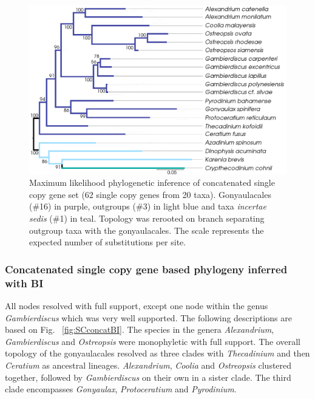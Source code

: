 \documentclass[12pt]{article}
\begin{document}
\begin{figure} 
\includegraphics[scale=.45]{figures/SC-concat-ML_WAG.png} 
\caption{Maximum likelihood phylogenetic inference of concatenated single copy gene set (62 single copy genes from 20 taxa). Gonyaulacales (\#16) in purple, outgroups (\#3) in light blue and taxa \textit{incertae sedis} (\#1) in teal. Topology was rerooted on branch separating outgroup taxa with the gonyaulacales. The scale represents the expected number of substitutions per site.} 
\label{fig:SCconcatML}
\end{figure} 
\FloatBarrier

\subsubsection{Concatenated single copy gene based phylogeny inferred with BI}
\FloatBarrier 
All nodes resolved with full support, except one node within the genus \textit{Gambierdiscus} which was very well supported. 
The following descriptions are based on Fig. ~\ref{fig:SCconcatBI}. 
The species in the genera \textit{Alexandrium}, \textit{Gambierdiscus} and \textit{Ostreopsis} were monophyletic with full support. 
The overall topology of the gonyaulacales resolved as three clades with \textit{Thecadinium} and then \textit{Ceratium} as ancestral lineages. 
\textit{Alexandrium}, \textit{Coolia} and \textit{Ostreopsis} clustered together, followed by \textit{Gambierdiscus} on their own in a sister clade. 
The third clade encompasses \textit{Gonyaulax}, \textit{Protoceratium} and \textit{Pyrodinium}. 
\end{document}
